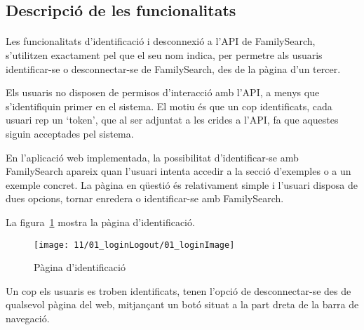 \subsection{Descripció de les funcionalitats}

    \paragraph{}
    Les funcionalitats d'identificació i desconnexió a l'API de FamilySearch, s'utilitzen exactament pel que el seu nom indica, per permetre als usuaris identificar-se o desconnectar-se de FamilySearch, des de la pàgina d'un tercer.

    Els usuaris no disposen de permisos d'interacció amb l'API, a menys que s'iden\-ti\-fi\-quin primer en el sistema. El motiu és que un cop identificats, cada usuari rep un `token', que al ser adjuntat a les crides a l'API, fa que aquestes siguin acceptades pel sistema.

    En l'aplicació web implementada, la possibilitat d'identificar-se amb FamilySearch apareix quan l'usuari intenta accedir a la secció d'exemples o a un exemple concret. La pàgina en qüestió és relativament simple i l'usuari disposa de dues opcions, tornar enredera o identificar-se amb FamilySearch.

    La figura~\ref{fig:fsLogin} mostra la pàgina d'identificació.

    \begin{figure}[h]
        \texttt{[image: 11/01\_loginLogout/01\_loginImage]}
        \centering
        \caption{Pàgina d'identificació}\label{fig:fsLogin}
    \end{figure}

    Un cop els usuaris es troben identificats, tenen l'opció de desconnectar-se des de qualsevol pàgina del web, mitjançant un botó situat a la part dreta de la barra de navegació.
